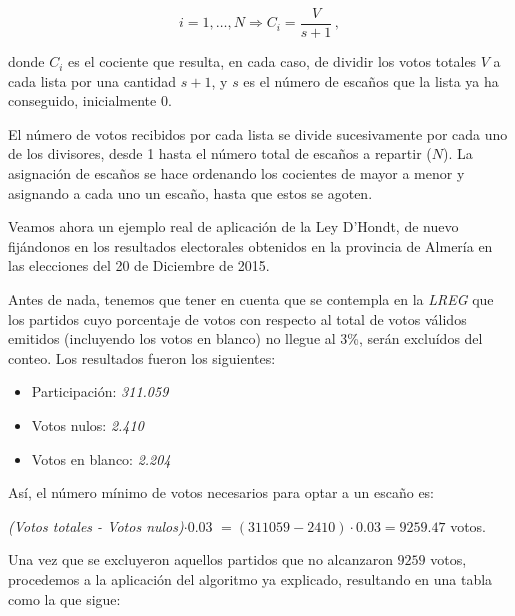 \documentclass[11pt]{article}
\newcommand\console[1]{{\inconsolata #1}}
\begin{document}
	$$i = 1,\ldots,N \Rightarrow C_i = \dfrac{V}{s + 1}\, ,$$
	
	donde $C_i$ es el cociente que resulta, en cada caso, de dividir los votos totales $V$ a cada lista por una cantidad $s + 1$, y $s$ es el número de escaños que la lista ya ha conseguido, inicialmente 0.
	
	El número de votos recibidos por cada lista se divide sucesivamente por cada uno de los divisores, desde 1 hasta el número total de escaños a repartir ($N$). La asignación de escaños se hace ordenando los cocientes de mayor a menor y asignando a cada uno un escaño, hasta que estos se agoten.
	
	Veamos ahora un ejemplo real de aplicación de la Ley D'Hondt, de nuevo fijándonos en los resultados electorales obtenidos en la provincia de Almería en las elecciones del 20 de Diciembre de 2015.
	
	Antes de nada, tenemos que tener en cuenta que se contempla en la \textit{LREG} que los partidos cuyo porcentaje de votos con respecto al total de votos válidos emitidos (incluyendo los votos en blanco) no llegue al 3\%, serán excluídos del conteo. Los resultados fueron los siguientes:
	
	\console{
	\begin{itemize}
	\item Participación: \textit{311.059}
	\item Votos nulos: \textit{2.410}
	\item Votos en blanco: \textit{2.204} 
	\end{itemize}
	}
	
	Así, el número mínimo de votos necesarios para optar a un escaño es:
	\begin{center}
	 \textit{(Votos totales - Votos nulos)$\cdot 0.03$} $= (311059 - 2410)\cdot 0.03 = 9259.47$ votos.
	\end{center}
	
	Una vez que se excluyeron aquellos partidos que no alcanzaron $9259$ votos, procedemos a la aplicación del algoritmo ya explicado, resultando en una tabla como la que sigue:
	
\end{document}
